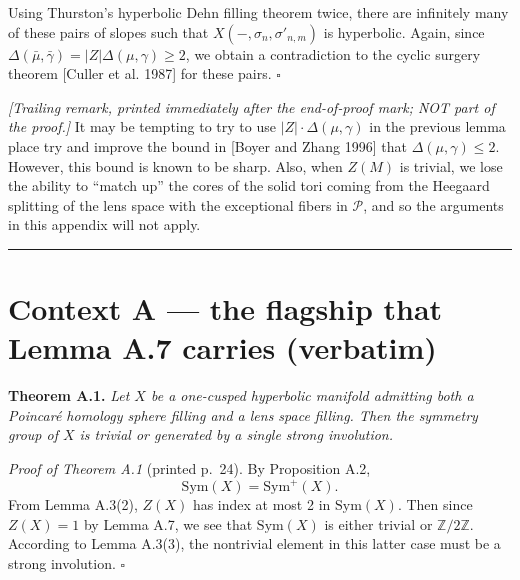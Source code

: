 \documentclass[11pt]{article}
\newcommand{\Sym}{\ensuremath{\mathrm{Sym}}}
\newcommand{\Ps}{\ensuremath{\mathcal{P}}}   %
\begin{document}
Using Thurston's hyperbolic Dehn filling theorem twice, there are infinitely many of these pairs
of slopes such that $X(-,\sigma_n,\sigma'_{n,m})$
is hyperbolic. Again, since $\Delta(\bar\mu,\bar\gamma) = |Z|\Delta(\mu,\gamma) \ge 2$, we obtain a
contradiction to the cyclic surgery theorem [Culler et al. 1987] for these pairs.
\hfill$\square$

\medskip
\noindent\textit{[Trailing remark, printed immediately after the end-of-proof mark; NOT part of
the proof.]} It may be tempting to try to use $|Z|\cdot\Delta(\mu,\gamma)$ in the previous lemma
place try and improve the bound in [Boyer and Zhang 1996] that $\Delta(\mu,\gamma) \le 2$. However,
this bound is known to be sharp. Also, when $Z(M)$
is trivial, we lose the ability to ``match up'' the cores of the solid tori coming from the Heegaard
splitting of the lens space with the exceptional fibers in $\Ps$, and so the arguments in this
appendix will not apply.

\bigskip
\hrule
\bigskip

\section*{Context A --- the flagship that Lemma A.7 carries (verbatim)}


\noindent\textbf{Theorem A.1.} \emph{Let $X$ be a one-cusped hyperbolic manifold admitting both a
Poincar\'e homology sphere filling and a lens space filling. Then the symmetry group of $X$ is
trivial or generated by a single strong involution.}

\medskip
\noindent\textit{Proof of Theorem A.1} (printed p.~24). By Proposition A.2,
\[
\Sym(X) = \Sym^+(X).
\]
From Lemma A.3(2), $Z(X)$ has index at most 2 in $\Sym(X)$. Then since $Z(X) = 1$ by Lemma A.7, we
see that $\Sym(X)$ is either trivial or $\mathbb{Z}/2\mathbb{Z}$. According to Lemma A.3(3), the
nontrivial element in this latter case must be a strong involution. \hfill$\square$
\end{document}
